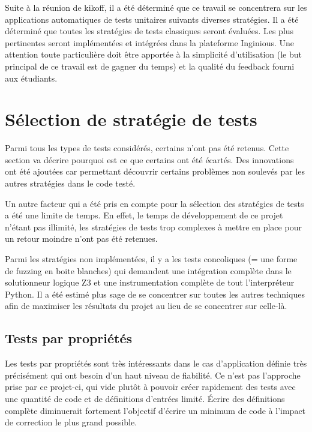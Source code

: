 \documentclass[a4paper]{report}
\begin{document}
Suite à la réunion de kikoff, il a été déterminé que ce travail se concentrera sur les applications automatiques de tests unitaires suivants diverses stratégies.
Il a été déterminé que toutes les stratégies de tests classiques seront évaluées.
Les plus pertinentes seront implémentées et intégrées dans la plateforme Inginious.
Une attention toute particulière doit être apportée à la simplicité d’utilisation (le but principal de ce travail est de gagner du temps) et la qualité du feedback fourni aux étudiants.
 
 
\section{Sélection de stratégie de tests}

Parmi tous les types de tests considérés, certains n'ont pas été retenus.
Cette section va décrire pourquoi est ce que certains ont été écartés.
Des innovations ont été ajoutées car permettant découvrir certains problèmes non soulevés par les autres stratégies dans le code testé.

Un autre facteur qui  a été pris en compte pour la sélection des stratégies de tests a été  une limite de temps.
En effet, le temps de développement de ce projet n'étant pas illimité, les stratégies de tests trop complexes à mettre en place pour un retour moindre n'ont pas été retenues.

Parmi les stratégies non implémentées, il y a les tests concoliques (= une forme de fuzzing en boite blanches) qui demandent une intégration complète dans le solutionneur logique Z3 et une instrumentation complète de tout l'interpréteur Python.
Il a été estimé plus sage de se concentrer sur toutes les autres techniques afin de maximiser les résultats du projet au lieu de se concentrer sur celle-là.


\subsection{Tests par propriétés}

Les tests par propriétés sont très intéressants dans le cas d'application définie très précisément qui ont besoin d'un haut niveau de fiabilité.
Ce n'est pas l'approche prise par ce projet-ci, qui vide plutôt à pouvoir créer rapidement des tests avec une quantité de code et de définitions d'entrées limité.
Écrire des définitions complète diminuerait fortement l'objectif d'écrire un minimum de code à l'impact de correction le plus grand possible.
\end{document}
